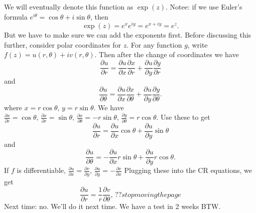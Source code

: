 We will eventually denote this function as $\exp(z)$. Notee: if we use Euler's formula $e^{i\theta}=\cos\theta+i\sin \theta$, then \[
    \exp(z)=e^{x}e^{iy}=e^{x+iy}=e^{z}.
\] But we have to make sure we can add the exponents first. Before discussing this further, consider polar coordinates for $z$. For any function $g$, write $f(z)=u(r,\theta)+iv(r,\theta)$. Then after the change of coordinates we have \[
\frac{\partial u}{\partial r}=\frac{\partial u}{\partial x}\frac{\partial x}{\partial r}+\frac{\partial u}{\partial y}\frac{\partial y}{\partial r}
\] and \[
\frac{\partial u}{\partial \theta}=\frac{\partial u}{\partial x}\frac{\partial x}{\partial \theta}+\frac{\partial u}{\partial y}\frac{\partial y}{\partial \theta}.
\] where $x=r\cos\theta$, $y=r\sin \theta$. We have $\frac{\partial x}{\partial r}=\cos\theta,\, \frac{\partial x}{\partial r}=\sin \theta,\, \frac{\partial x}{\partial \theta}=-r\sin \theta,\, \frac{\partial y}{\partial \theta}=r\cos\theta$. Use these to get \[
\frac{\partial u}{\partial r}=\frac{\partial u}{\partial x}\cos\theta+\frac{\partial u}{\partial y}\sin\theta
\] and \[
\frac{\partial u}{\partial \theta}=-\frac{\partial u}{\partial x}r\sin\theta + \frac{\partial u}{\partial y}r\cos\theta.
\] If $f$ is differentiable, $\frac{\partial u}{\partial x}=\frac{\partial v}{\partial y}$, $\frac{\partial u}{\partial y}=-\frac{\partial v}{\partial x}$
Plugging these into the CR equations, we get \[
\frac{\partial u}{\partial r}=\frac{1}{r}\frac{\partial v}{\partial \theta},\, ?? stop moving the page
\] 
Next time: no. We'll do it next time. We have a test in 2 weeks BTW.
